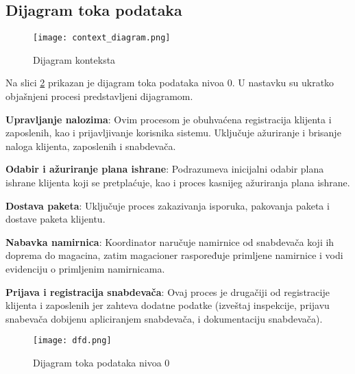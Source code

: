 \subsection{Dijagram toka podataka}

\begin{figure}[H]
	\begin{center}
		\texttt{[image: context\_diagram.png]}

	    \caption{Dijagram konteksta}
	\label{fig:context_diagram}
    \end{center}
    
\end{figure}

	Na slici \ref{fig:DFD} prikazan je dijagram toka podataka nivoa 0. U nastavku su ukratko objašnjeni procesi predstavljeni dijagramom.
	
	
	\textbf{Upravljanje nalozima}: Ovim procesom je obuhvaćena registracija klijenta i zaposlenih, kao i prijavljivanje korisnika sistemu. Uključuje ažuriranje i brisanje naloga klijenta, zaposlenih i snabdevača.
	
	\textbf{Odabir i ažuriranje plana ishrane}: Podrazumeva inicijalni odabir plana ishrane klijenta koji se pretplaćuje, kao i proces kasnijeg ažuriranja plana ishrane.
		
	\textbf{Dostava paketa}: Uključuje proces zakazivanja isporuka, pakovanja paketa i dostave paketa klijentu. 
	
	
	\textbf{Nabavka namirnica}: Koordinator naručuje namirnice od snabdevača koji ih doprema do magacina, zatim magacioner raspoređuje primljene namirnice i vodi evidenciju o primljenim namirnicama.
	
	
	\textbf{Prijava i registracija snabdevača}: Ovaj proces je drugačiji od registracije klijenta i zaposlenih jer zahteva dodatne podatke (izveštaj inspekcije, prijavu snabevača dobijenu apliciranjem snabdevača, i dokumentaciju snabdevača).


\begin{figure}[H]
	\begin{center}
		\texttt{[image: dfd.png]}

    		\caption{Dijagram toka podataka nivoa 0}
    \label{fig:DFD}
    \end{center}
 
\end{figure}

	
